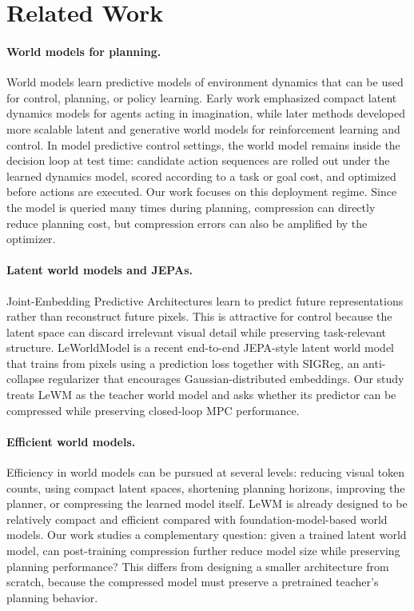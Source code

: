 \documentclass[11pt]{article}
\begin{document}
\section{Related Work}
\label{sec:related_work}

\paragraph{World models for planning.}
World models learn predictive models of environment dynamics that can be used for control, planning, or policy learning. Early work emphasized compact latent dynamics models for agents acting in imagination, while later methods developed more scalable latent and generative world models for reinforcement learning and control. In model predictive control settings, the world model remains inside the decision loop at test time: candidate action sequences are rolled out under the learned dynamics model, scored according to a task or goal cost, and optimized before actions are executed. Our work focuses on this deployment regime. Since the model is queried many times during planning, compression can directly reduce planning cost, but compression errors can also be amplified by the optimizer.

\paragraph{Latent world models and JEPAs.}
Joint-Embedding Predictive Architectures learn to predict future representations rather than reconstruct future pixels. This is attractive for control because the latent space can discard irrelevant visual detail while preserving task-relevant structure. LeWorldModel is a recent end-to-end JEPA-style latent world model that trains from pixels using a prediction loss together with SIGReg, an anti-collapse regularizer that encourages Gaussian-distributed embeddings. Our study treats LeWM as the teacher world model and asks whether its predictor can be compressed while preserving closed-loop MPC performance.

\paragraph{Efficient world models.}
Efficiency in world models can be pursued at several levels: reducing visual token counts, using compact latent spaces, shortening planning horizons, improving the planner, or compressing the learned model itself. LeWM is already designed to be relatively compact and efficient compared with foundation-model-based world models. Our work studies a complementary question: given a trained latent world model, can post-training compression further reduce model size while preserving planning performance? This differs from designing a smaller architecture from scratch, because the compressed model must preserve a pretrained teacher's planning behavior.
\end{document}
